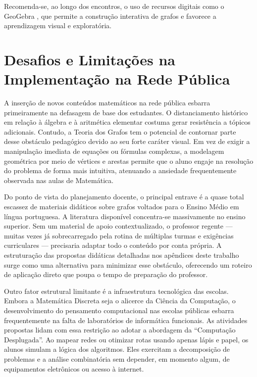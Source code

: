 \documentclass[
  12pt,
  oneside,
  a4paper,
  english,
  brazilian
  ]{abntex2}
\theoremstyle{definition}
\begin{document}
Recomenda-se, ao longo dos encontros, o uso de recursos digitais como o GeoGebra \cite{silva2020}, que permite a construção interativa de grafos e favorece a aprendizagem visual e exploratória.

\section{Desafios e Limitações na Implementação na Rede Pública}

A inserção de novos conteúdos matemáticos na rede pública esbarra primeiramente na defasagem de base dos estudantes. O distanciamento histórico em relação à álgebra e à aritmética elementar costuma gerar resistência a tópicos adicionais. Contudo, a Teoria dos Grafos tem o potencial de contornar parte desse obstáculo pedagógico devido ao seu forte caráter visual. Em vez de exigir a manipulação imediata de equações ou fórmulas complexas, a modelagem geométrica por meio de vértices e arestas permite que o aluno engaje na resolução do problema de forma mais intuitiva, atenuando a ansiedade frequentemente observada nas aulas de Matemática.

Do ponto de vista do planejamento docente, o principal entrave é a quase total escassez de materiais didáticos sobre grafos voltados para o Ensino Médio em língua portuguesa. A literatura disponível concentra-se massivamente no ensino superior. Sem um material de apoio contextualizado, o professor regente --- muitas vezes já sobrecarregado pela rotina de múltiplas turmas e exigências curriculares --- precisaria adaptar todo o conteúdo por conta própria. A estruturação das propostas didáticas detalhadas nos apêndices deste trabalho surge como uma alternativa para minimizar esse obstáculo, oferecendo um roteiro de aplicação direto que poupa o tempo de preparação do professor.

Outro fator estrutural limitante é a infraestrutura tecnológica das escolas. Embora a Matemática Discreta seja o alicerce da Ciência da Computação, o desenvolvimento do pensamento computacional nas escolas públicas esbarra frequentemente na falta de laboratórios de informática funcionais. As atividades propostas lidam com essa restrição ao adotar a abordagem da ``Computação Desplugada''. Ao mapear redes ou otimizar rotas usando apenas lápis e papel, os alunos simulam a lógica dos algoritmos. Eles exercitam a decomposição de problemas e a análise combinatória sem depender, em momento algum, de equipamentos eletrônicos ou acesso à internet.
\end{document}
